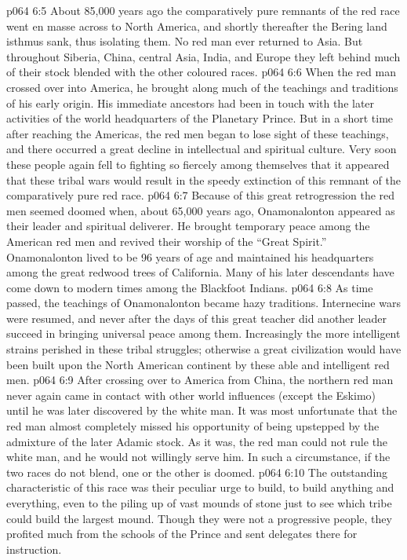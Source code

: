 \vs p064 6:5 About 85,000 years ago the comparatively pure remnants of the red race went en masse across to North America, and shortly thereafter the Bering land isthmus sank, thus isolating them. No red man ever returned to Asia. But throughout Siberia, China, central Asia, India, and Europe they left behind much of their stock blended with the other coloured races.
\vs p064 6:6 When the red man crossed over into America, he brought along much of the teachings and traditions of his early origin. His immediate ancestors had been in touch with the later activities of the world headquarters of the Planetary Prince. But in a short time after reaching the Americas, the red men began to lose sight of these teachings, and there occurred a great decline in intellectual and spiritual culture. Very soon these people again fell to fighting so fiercely among themselves that it appeared that these tribal wars would result in the speedy extinction of this remnant of the comparatively pure red race.
\vs p064 6:7 Because of this great retrogression the red men seemed doomed when, about 65,000 years ago, Onamonalonton appeared as their leader and spiritual deliverer. He brought temporary peace among the American red men and revived their worship of the “Great Spirit.” Onamonalonton lived to be 96 years of age and maintained his headquarters among the great redwood trees of California. Many of his later descendants have come down to modern times among the Blackfoot Indians.
\vs p064 6:8 As time passed, the teachings of Onamonalonton became hazy traditions. Internecine wars were resumed, and never after the days of this great teacher did another leader succeed in bringing universal peace among them. Increasingly the more intelligent strains perished in these tribal struggles; otherwise a great civilization would have been built upon the North American continent by these able and intelligent red men.
\vs p064 6:9 After crossing over to America from China, the northern red man never again came in contact with other world influences (except the Eskimo) until he was later discovered by the white man. It was most unfortunate that the red man almost completely missed his opportunity of being upstepped by the admixture of the later Adamic stock. As it was, the red man could not rule the white man, and he would not willingly serve him. In such a circumstance, if the two races do not blend, one or the other is doomed.
\vs p064 6:10 \bibnobreakspace {} The outstanding characteristic of this race was their peculiar urge to build, to build anything and everything, even to the piling up of vast mounds of stone just to see which tribe could build the largest mound. Though they were not a progressive people, they profited much from the schools of the Prince and sent delegates there for instruction.
